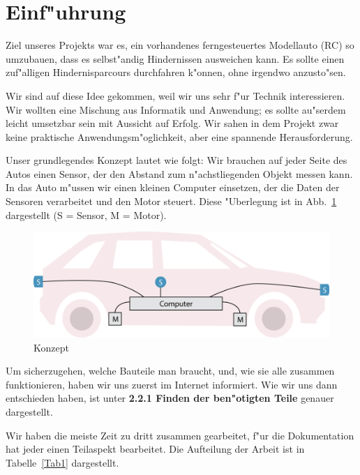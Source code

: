 \documentclass[a4paper,12pt]{article}
\begin{document}
\newpage


\tableofcontents

\newpage


\section{Einf"uhrung}\label{sec1}

Ziel unseres Projekts war es, ein vorhandenes ferngesteuertes Modellauto (RC) so umzubauen, dass es selbst"andig Hindernissen ausweichen kann.
Es sollte einen zuf"alligen Hindernisparcours durchfahren k"onnen, ohne irgendwo anzusto"sen.

Wir sind auf diese Idee gekommen, weil wir uns sehr f"ur Technik interessieren.
Wir wollten eine Mischung aus Informatik und Anwendung; es sollte au"serdem leicht umsetzbar sein mit Aussicht auf Erfolg.
Wir sahen in dem Projekt zwar keine praktische Anwendungsm"oglichkeit, aber eine spannende Herausforderung.

Unser grundlegendes Konzept lautet wie folgt:
Wir brauchen auf jeder Seite des Autos einen Sensor, der den Abstand zum n"achstliegenden Objekt messen kann.
In das Auto m"ussen wir einen kleinen Computer einsetzen, der die Daten der Sensoren verarbeitet und den Motor steuert.
Diese "Uberlegung ist in Abb.~\ref{Fig1} dargestellt (S = Sensor, M = Motor).

\begin{figure}[h]
	\centering
	\includegraphics[width=12cm]{./media/overview.png}
	\caption{Konzept}
	\label{Fig1}
\end{figure}

Um sicherzugehen, welche Bauteile man braucht, und, wie sie alle zusammen funktionieren, haben wir uns zuerst im Internet informiert.
Wie wir uns dann entschieden haben, ist unter {\bf 2.2.1 Finden der ben"otigten Teile} genauer dargestellt.

Wir haben die meiste Zeit zu dritt zusammen gearbeitet, f"ur die Dokumentation hat jeder einen Teilaspekt bearbeitet.
Die Aufteilung der Arbeit ist in Tabelle~\ref{Tab1} dargestellt.
\end{document}
